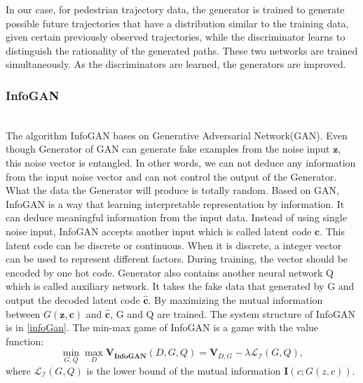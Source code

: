 In our case, for pedestrian trajectory data, the generator is trained to generate possible future trajectories that have a distribution similar to the training data, given certain previously observed trajectories, while the discriminator learns to distinguish the rationality of the generated paths. These two networks are trained simultaneously. As the discriminators are learned, the generators are improved.

\subsubsection{InfoGAN}

\hfill \\
The algorithm InfoGAN bases on Generative Adversarial Network(GAN). Even though Generator of GAN can generate fake examples from the noise input \(\mathbf{z}\), this noise vector is entangled. In other words, we can not deduce any information from the input noise vector and can not control the output of the Generator. What the data the Generator will produce is totally random. Based on GAN, InfoGAN is a way that learning interpretable representation by information. It can deduce meaningful information from the input data. Instead of using single noise input, InfoGAN accepts another input which is called latent code \(\mathbf{c}\). This latent code can be discrete or continuous. When it is discrete, a integer vector can be used to represent different factors. During training, the vector should be encoded by one hot code. Generator also contains another neural network Q which is called auxiliary network. It takes the fake data that generated by G and output the decoded latent code \( \mathbf{\hat{c}}\). By maximizing the mutual information between \( G(\mathbf{z, c})\) and \( \mathbf{\hat{c}}\), G and Q are trained. The system structure of InfoGAN is in \ref{infoGan}. The min-max game of InfoGAN is a game with the value function\cite{infogan}:
\[\min_{G,Q}\max_{D} \mathbf{V_{InfoGAN}}(D, G, Q) = \mathbf{V}_{D, G} - \lambda \mathcal{L_I}(G,Q),\] where \(\mathcal{L_I}(G,Q)\) is the lower bound of the mutual information \(\mathbf{I}(c;G(z,c))\).
